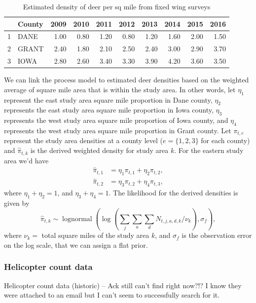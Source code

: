 \documentclass[12pt]{article}\usepackage[]{graphicx}\usepackage[]{color}
\DeclareMathOperator{\dlnorm}{lognormal}
\begin{document}
\begin{table}[H]
\centering
\begin{tabular}{rlrrrrrrrr}
  \hline
 & County & 2009 & 2010 & 2011 & 2012 & 2013 & 2014 & 2015 & 2016 \\ 
  \hline
1 & DANE & 1.00 & 0.80 & 1.20 & 0.80 & 1.20 & 1.60 & 2.00 & 1.50 \\ 
  2 & GRANT & 2.40 & 1.80 & 2.10 & 2.50 & 2.40 & 3.00 & 2.90 & 3.70 \\ 
  3 & IOWA & 2.80 & 2.60 & 3.40 & 3.30 & 3.90 & 4.20 & 3.60 & 3.50 \\ 
   \hline
\end{tabular}
\caption{Estimated density of deer per sq mile from fixed wing surveys} 
\label{tab:fixedwing}
\end{table}


\noindent We can link the process model to estimated deer densities based on the weighted average of square mile area that is within the study area. In other words, let $\eta_1$ represent the east study area square mile proportion in Dane county, $\eta_2$ represents the east study area square mile proportion in Iowa county, $\eta_3$ represents the west study area square mile proportion of Iowa county, and $\eta_4$ represents the west study area square mile proportion in Grant county. Let $\pi_{t,e}$ represent the study area densities at a county level ($e = \{1,2,3\}$ for each county) and $\hat{\pi}_{t,k}$ is the derived weighted density for study area $k$. For the eastern study area we'd have 
\begin{align}
\hat{\pi}_{t,1} & = \eta_1\pi_{t,1} + \eta_2\pi_{t,2},\\
\hat{\pi}_{t,2} & = \eta_3\pi_{t,2} + \eta_4\pi_{t,3},
\end{align}
\noindent where $\eta_1 + \eta_2 = 1$, and $\eta_3 + \eta_4 = 1$. The likelihood for the derived densities is given by
\begin{equation}
\hat{\pi}_{t,k} \sim \dlnorm (\log(\sum_j \sum_a \sum_d N_{t,j,a,d,k}/\nu_k),\sigma_f),
\end{equation}
\noindent where $\nu_k =$ total square miles of the study area $k$, and $\sigma_f$ is the observation error on the log scale, that we can assign a flat prior.

\subsubsection{Helicopter count data}
Helicopter count data (historic) – Ack still can’t find right now?!? I know they were attached to an email but I can't seem to successfully search for it.
\end{document}
